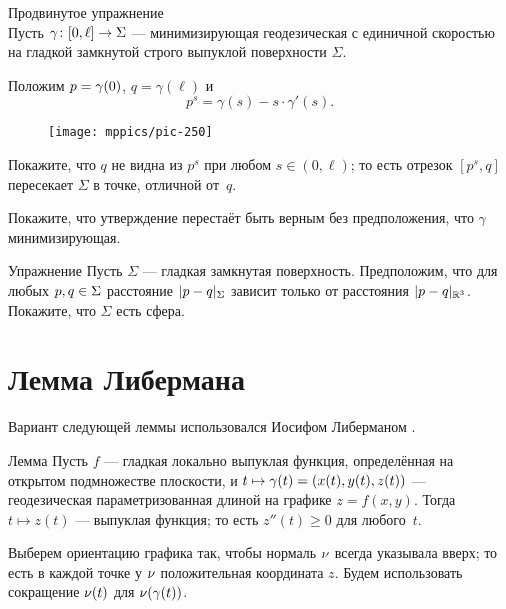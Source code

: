 {

\begin{thm}{Продвинутое упражнение}\label{ex:milka}\\
Пусть $\gamma\:[0,\ell]\z\to \Sigma$ --- минимизирующая геодезическая с единичной скоростью на 
гладкой замкнутой строго выпуклой поверхности $\Sigma$.

Положим $p\z=\gamma(0)$, $q=\gamma(\ell)$ и 
\[p^s=\gamma(s)-s\cdot\gamma'(s).\]

\begin{wrapfigure}{r}{40 mm}
\vskip-4mm
\centering
\texttt{[image: mppics/pic-250]}
\vskip-0mm
\end{wrapfigure}

Покажите, что $q$ не видна из $p^s$ при любом $s\in (0,\ell)$;
то есть отрезок $[p^s,q]$ пересекает $\Sigma$ в точке, отличной от~$q$.

Покажите, что утверждение перестаёт быть верным без предположения, что $\gamma$ минимизирующая.
\end{thm}

}

\begin{wrapfigure}[3]{r}{40 mm}
\end{wrapfigure}

\begin{thm}{Упражнение}\label{ex:round-sphere}
Пусть $\Sigma$ --- гладкая замкнутая поверхность.
Предположим, что для любых $p,q\z\in \Sigma$ расстояние $\dist{p}{q}\Sigma$ зависит только от расстояния $\dist{p}{q}{\mathbb{R}^3}$.
Покажите, что $\Sigma$ есть сфера.
\end{thm}



\section{Лемма Либермана}

Вариант следующей леммы использовался Иосифом Либерманом \cite{liberman}.

\begin{thm}{Лемма}
\label{lem:liberman}
Пусть $f$ --- гладкая локально выпуклая функция, определённая на открытом подмножестве плоскости,
и $t\mapsto \gamma(t)\z=(x(t),y(t),z(t))$ --- геодезическая параметризованная длиной на графике $z=f(x,y)$.
Тогда $t\mapsto z(t)$ --- выпуклая функция; то есть $z''(t)\ge 0$ для любого~$t$.
\end{thm}

Выберем ориентацию графика так, чтобы нормаль $\nu$ всегда указывала вверх;
то есть в каждой точке у $\nu$ положительная координата $z$.
Будем использовать сокращение $\nu(t)$ для $\nu(\gamma(t))$.

